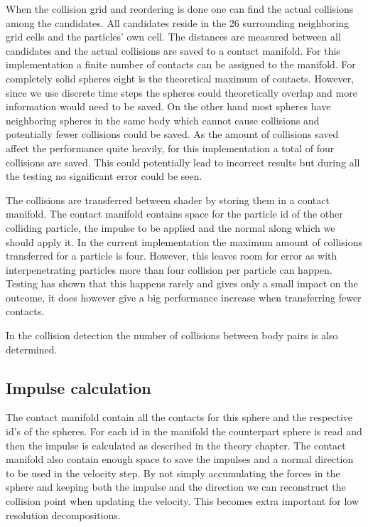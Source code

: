 When the collision grid and reordering is done one can find the actual collisions
among the candidates. All candidates reside in the 26 surrounding neighboring
grid cells and the particles' own cell. The distances are measured between all
candidates and the actual collisions are saved to a contact manifold.
For this implementation a finite number of
contacts can be assigned to the manifold. For completely solid spheres eight
is the theoretical maximum of contacts. However, since we use discrete time steps
the spheres could theoretically overlap and more information would need to be saved.
On the other hand most spheres have neighboring spheres in the same body which cannot
cause collisions and potentially fewer collisions could be saved. As the amount of
collisions saved affect the performance quite heavily, for this implementation a total
of four collisions are saved. This could potentially lead to incorrect results but
during all the testing no significant error could be seen.

The collisions are transferred between shader by storing them in a contact manifold.
The contact manifold contains space for the particle id of the other colliding particle,
the impulse to be applied and the normal along which we should apply it.
In the current implementation the maximum amount of collisions transferred for a
particle is four. However, this leaves room for error as with interpenetrating particles
more than four collision per particle can happen. Testing has shown that this happens
rarely and gives only a small impact on the outcome, it does however give a big
performance increase when transferring fewer contacts.

In the collision detection the number of collisions between body pairs is also determined.

\subsection{Impulse calculation}
The contact manifold contain all the contacts for this sphere and the respective
id's of the spheres. For each id in the manifold the counterpart sphere is read and
then the impulse is calculated as described in the theory chapter. The contact manifold
also contain enough space to save the impulses and a normal direction to be used
in the velocity step. By not simply accumulating the forces in the sphere and keeping
both the impulse and the direction we can reconstruct the collision point when updating
the velocity. This becomes extra important for low resolution decompositions.

